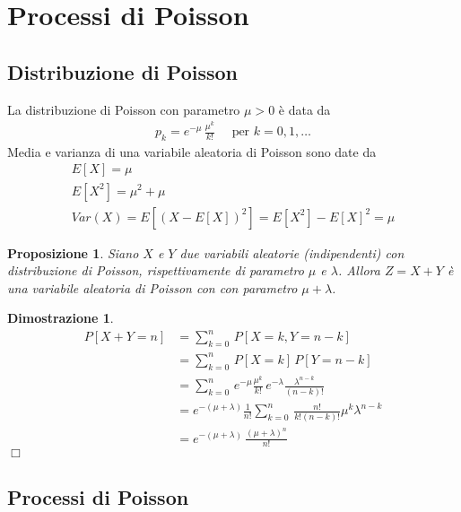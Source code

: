 \documentclass{article}
\newtheorem{proposizione}{Proposizione}[section]
\newtheorem*{dimostrazione*}{Dimostrazione}
\newcommand*{\QED}{\hfill\ensuremath{\Box}}
\begin{document}
\newpage
\section{Processi di Poisson}


\subsection{Distribuzione di Poisson}

La distribuzione di Poisson con parametro $\mu > 0$ è data da
\begin{align}
\label{pp_distribuzione_poisson}
p_k = e^{-\mu}\,\frac{\mu^k}{k!}\quad \text{ per } k = 0,1,\hdots
\end{align}
Media e varianza di una variabile aleatoria di Poisson sono date da
\begin{gather*}
E[X] = \mu\\
E[X^2] = \mu^2 + \mu\\
Var(X) = E[(X - E[X])^2] = E[X^2] - E[X]^2 = \mu  
\end{gather*}

\begin{proposizione}
\label{pp_somma_due_poisson}
Siano $X$ e $Y$ due variabili aleatorie (indipendenti) con distribuzione di Poisson, rispettivamente di parametro $\mu$ e $\lambda$. Allora $Z = X + Y$ è una variabile aleatoria di Poisson con con parametro $\mu + \lambda$.
\end{proposizione}
\begin{dimostrazione*}
\begin{align*}
P[X + Y = n] &= \sum_{k=0}^n\,P[X=k,Y=n-k]\\
&= \sum_{k=0}^n\,P[X = k]\,P[Y = n-k]\\
&= \sum_{k = 0}^n\,e^{-\mu}\frac{\mu^k}{k!}\,e^{-\lambda}\frac{\lambda^{n-k}}{(n-k)!}\\
&= e^{-(\mu+\lambda)}\frac{1}{n!}\sum_{k=0}^n\,\frac{n!}{k!(n-k)!}\mu^k\lambda^{n-k}\\
&= e^{-(\mu+\lambda)}\,\frac{(\mu+\lambda)^n}{n!}
\end{align*}
\QED
\end{dimostrazione*}

\subsection{Processi di Poisson}
\end{document}

